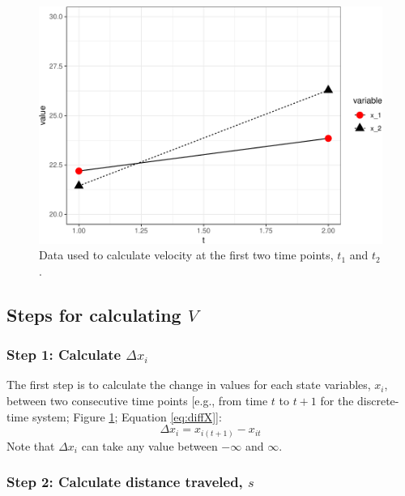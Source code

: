 \documentclass[12pt,twoside,openany]{reedthesis}
\begin{document}
\begin{figure}
\includegraphics[width=0.85\linewidth]{_myDissertation_files/figure-latex/sysEx2-1} \caption{Data used to calculate velocity at the first two time points, $t_1$ and $t_2$.}\label{fig:sysEx2}
\end{figure}
\hypertarget{steps-for-calculating-v}{%
\subsection{\texorpdfstring{Steps for calculating \(V\)}{Steps for calculating V}}\label{steps-for-calculating-v}}

\hypertarget{step-1-calculate-delta-x_i}{%
\subsubsection{\texorpdfstring{Step 1: Calculate \(\Delta x_i\)}{Step 1: Calculate \textbackslash Delta x\_i}}\label{step-1-calculate-delta-x_i}}

The first step is to calculate the change in values for each state variables, \(x_i\), between two consecutive time points {[}e.g., from time \(t\) to \(t+1\) for the discrete-time system; Figure \ref{fig:sysEx2}; Equation \eqref{eq:diffX}{]}:
\begin{equation}
\Delta x_i = x_{i(t+1)} - x_{it} 
\label{eq:diffX}
\end{equation}
Note that \(\Delta x_i\) can take any value between \(-\infty\) and \(\infty\).

\hypertarget{step-2-calculate-distance-traveled-s}{%
\subsubsection{\texorpdfstring{Step 2: Calculate distance traveled, \(s\)}{Step 2: Calculate distance traveled, s}}\label{step-2-calculate-distance-traveled-s}}
\end{document}
